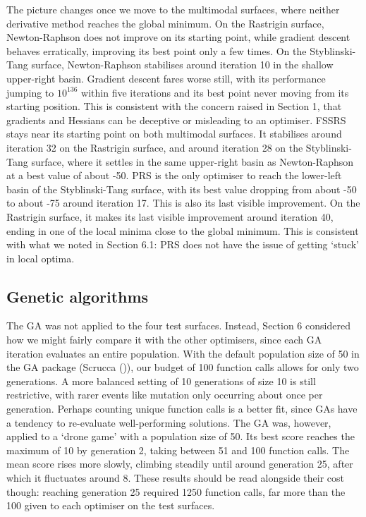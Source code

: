 \documentclass[
  a4paper,
]{article}
\newcommand{\+}{\phantom{-}}
\begin{document}
The picture changes once we move to the multimodal surfaces, where
neither derivative method reaches the global minimum. On the Rastrigin
surface, Newton-Raphson does not improve on its starting point, while
gradient descent behaves erratically, improving its best point only a
few times. On the Styblinski-Tang surface, Newton-Raphson stabilises
around iteration 10 in the shallow upper-right basin. Gradient descent
fares worse still, with its performance jumping to \(10^{136}\) within
five iterations and its best point never moving from its starting
position. This is consistent with the concern raised in Section 1, that
gradients and Hessians can be deceptive or misleading to an optimiser.
FSSRS stays near its starting point on both multimodal surfaces. It
stabilises around iteration 32 on the Rastrigin surface, and around
iteration 28 on the Styblinski-Tang surface, where it settles in the
same upper-right basin as Newton-Raphson at a best value of about -50.
PRS is the only optimiser to reach the lower-left basin of the
Styblinski-Tang surface, with its best value dropping from about -50 to
about -75 around iteration 17. This is also its last visible
improvement. On the Rastrigin surface, it makes its last visible
improvement around iteration 40, ending in one of the local minima close
to the global minimum. This is consistent with what we noted in Section
6.1: PRS does not have the issue of getting `stuck' in local optima.

\subsection{Genetic algorithms}\label{genetic-algorithms}

The GA was not applied to the four test surfaces. Instead, Section 6
considered how we might fairly compare it with the other optimisers,
since each GA iteration evaluates an entire population. With the default
population size of 50 in the GA package (Scrucca
()), our budget of 100 function calls
allows for only two generations. A more balanced setting of 10
generations of size 10 is still restrictive, with rarer events like
mutation only occurring about once per generation. Perhaps counting
unique function calls is a better fit, since GAs have a tendency to
re-evaluate well-performing solutions. The GA was, however, applied to a
`drone game' with a population size of 50. Its best score reaches the
maximum of 10 by generation 2, taking between 51 and 100 function calls.
The mean score rises more slowly, climbing steadily until around
generation 25, after which it fluctuates around 8. These results should
be read alongside their cost though: reaching generation 25 required
1250 function calls, far more than the 100 given to each optimiser on
the test surfaces.
\end{document}
